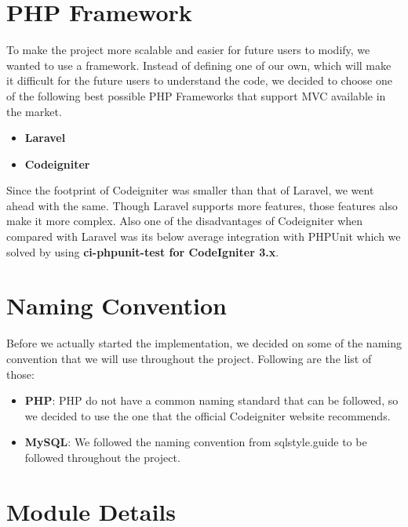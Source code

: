 \documentclass{mnnit}
\begin{document}
\section{PHP Framework}
To make the project more scalable and easier for future users to modify, we wanted to use a framework. Instead of defining one of our own, which will make it difficult for the future users to understand the code, we decided to choose one of the following best possible PHP Frameworks that support MVC available in the market.
\begin{itemize}
    \item \textbf{Laravel}
    \item \textbf{Codeigniter}
\end{itemize}
Since the footprint of Codeigniter was smaller than that of Laravel, we went ahead with the same. Though Laravel supports more features, those features also make it more complex\cite{Refworks=4}. Also one of the disadvantages of Codeigniter when compared with Laravel was its below average integration with PHPUnit which we solved by using \textbf{ci-phpunit-test for CodeIgniter 3.x}.\cite{Refworks=5}
\section{Naming Convention}
Before we actually started the implementation, we decided on some of the naming convention that we will use throughout the project. Following are the list of those:
\begin{itemize}
    \item \textbf{PHP}: PHP do not have a common naming standard that can be followed, so we decided to use the one that the official Codeigniter website recommends.\cite{Refworks=2}
    \item \textbf{MySQL}: We followed the naming convention from sqlstyle.guide to be followed throughout the project.\cite{Refworks=3}
\end{itemize}
\section{Module Details}
\end{document}
